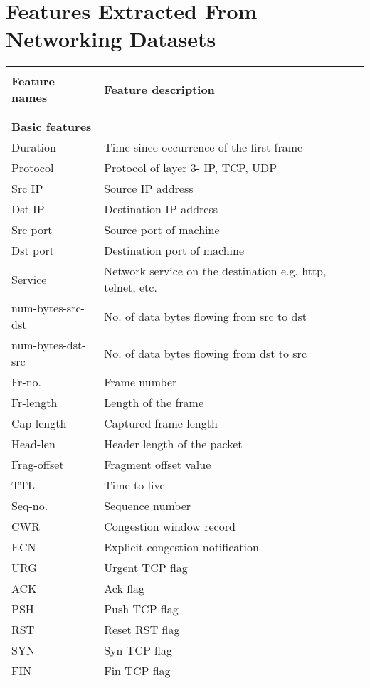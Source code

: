 \chapter{Features Extracted From Networking Datasets}
\label{chapter:ThisIsMyAppendixChapter}

\centering
{\footnotesize
	 \label{tab:tuids1}
	\begin{tabular}{llr}
		\hline
		&  \\
		\textbf{Feature names}    & \textbf{Feature description} \\
		&  \\
		\hline
		&  \\
		\textbf{Basic features} & \\
		Duration & Time since occurrence of the first frame\\
		Protocol & Protocol of layer 3- IP, TCP, UDP \\
		Src IP & Source IP address\\
		Dst IP & Destination IP address\\
		Src port & Source port of machine\\
		Dst port & Destination port of machine\\
		Service & Network service on the destination e.g. http, telnet, etc.\\
		num-bytes-src-dst & No. of data bytes flowing from src to dst\\
		num-bytes-dst-src & No. of data bytes flowing from dst to src\\
		Fr-no. & Frame number\\
		Fr-length & Length of the frame\\
		Cap-length & Captured frame length\\
		Head-len & Header length of the packet\\
		Frag-offset & Fragment offset value\\
		TTL & Time to live\\
		Seq-no. & Sequence number\\
		CWR & Congestion window record\\
		ECN & Explicit congestion notification\\
		URG & Urgent TCP flag\\
		ACK & Ack flag\\
		PSH & Push TCP flag\\
		RST & Reset RST flag\\
		SYN & Syn TCP flag\\
		FIN & Fin TCP flag\\

		
		\hline
	\end{tabular}
}
\bigskip
\bigskip
\bigskip
\bigskip

